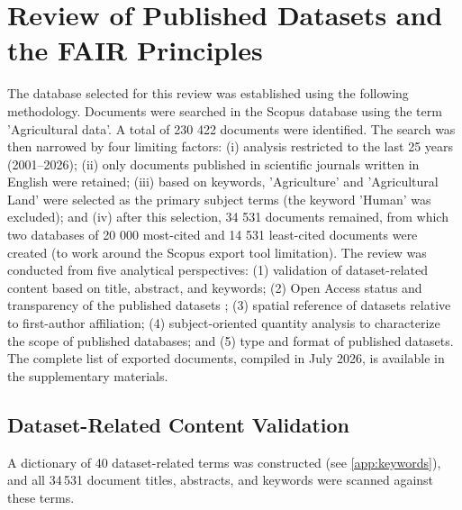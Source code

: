 \documentclass[preprint,12pt,authoryear]{elsarticle}
\begin{document}
\section{Review of Published Datasets and the FAIR Principles}
\label{Review}
The database selected for this review was established using the following methodology. Documents were searched in the Scopus database using the term 'Agricultural data'. A total of 230 422 documents were identified. The search was then narrowed by four limiting factors: (i) analysis restricted to the last 25 years (2001–2026); (ii) only documents published in scientific journals written in English were retained; (iii) based on keywords, 'Agriculture' and 'Agricultural Land' were selected as the primary subject terms (the keyword 'Human' was excluded); and (iv) after this selection, 34 531 documents remained, from which two databases of 20 000 most-cited and 14 531 least-cited documents were created (to work around the Scopus export tool limitation). The review was conducted from five analytical perspectives: (1) validation of dataset-related content based on title, abstract, and keywords; (2) Open Access status and transparency of the published datasets \citep{DORA2013, Wilkinson2016}; (3) spatial reference of datasets relative to first-author affiliation; (4) subject-oriented quantity analysis to characterize the scope of published databases; and (5) type and format of published datasets. The complete list of exported documents, compiled in July 2026, is available in the supplementary materials.


\subsection{Dataset-Related Content Validation}
\label{Review:sub1}
A dictionary of 40 dataset-related terms was constructed (see \ref{app:keywords}), and all 34\,531 document titles, abstracts, and keywords were scanned against these terms.
\end{document}
